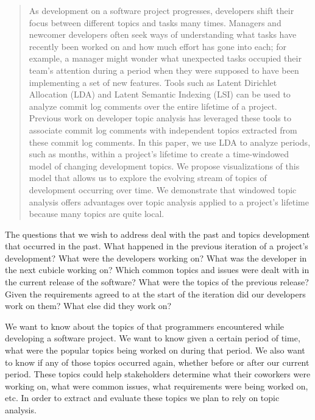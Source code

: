 \documentclass[times, 10pt,twocolumn]{article}
\newcommand{\hla}[1]{{\color{changecolor2} #1 }}
\begin{document}
\begin{abstract}

  As development on a software project progresses, developers shift their focus between different topics and tasks many
  times.  Managers and newcomer developers often seek ways of
  understanding what tasks have recently been worked on and how much
  effort has gone into each; for example, a manager might wonder what
  unexpected tasks occupied their team's attention during a period
  when they were supposed to have been implementing a set of new
  features.  Tools such as Latent Dirichlet Allocation (LDA) and
  \hla{
    Latent Semantic Indexing (LSI) can be used to analyze commit log
  }
  comments over the entire lifetime of a project. Previous work on
  developer topic analysis has leveraged these tools to associate
  commit log comments with independent topics extracted from these
  commit log comments.  In this paper, we use LDA  to analyze
  periods, such as months, within a project's lifetime to create a
  time-windowed model of changing development topics.  We propose 
  visualizations of this model that allows us to explore the evolving
  stream of topics of development occurring over time.  We demonstrate
  that windowed topic analysis offers advantages over topic analysis
  applied to a project's lifetime because many topics are quite local.



\end{abstract}


\hla{ The questions that we wish to address deal with the past and
  topics development that occurred in the past.  What happened in
  the previous iteration of a project's development?  What were the
  developers working on? What was the developer in the next cubicle
  working on? Which common topics and issues were dealt with in the
  current release of the software? What were the topics of the
  previous release? Given the requirements agreed to at the start of
  the iteration did our developers work on them?  What else did they
  work on?  }

\hla{
We want to know about the topics of that programmers
encountered while developing a software project. We want to know given
a certain period of time, what were the popular topics being worked on
during that period. We also want to know if any of those topics
occurred again, whether before or after our current period.  These
topics could help stakeholders determine what their coworkers were
working on, what were common issues, what requirements were being
worked on, etc. In order to extract and evaluate these topics we plan
to rely on topic analysis.
}
\end{document}
